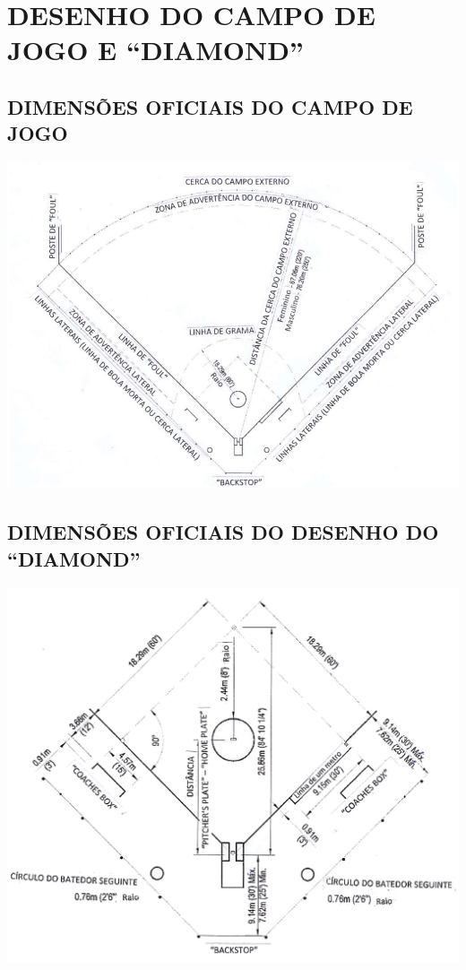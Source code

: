 \chapter{DESENHO DO CAMPO DE JOGO E “DIAMOND”}
\label{ap:Campo}

\section{DIMENSÕES OFICIAIS DO CAMPO DE JOGO}

{\begin{center}
		\includegraphics[width=.70\textwidth]{fig/campo01}
\end{center}}
\clearpage
\section{DIMENSÕES OFICIAIS DO DESENHO DO “DIAMOND” }

{\begin{center}
		\includegraphics[width=.75\textwidth]{fig/campo02}\end{center}}

